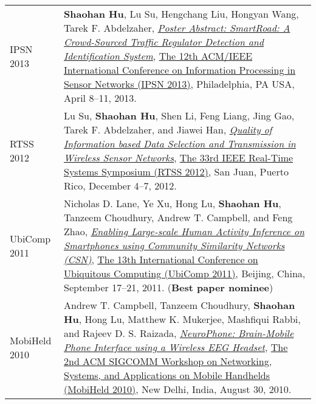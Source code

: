 \begin{longtabu}{p{.51\sectionwidth} p{.78\resumewidth}}
{\sc IPSN 2013}\hypertarget{hu2013ipsn}{} &
\textbf{Shaohan Hu}, Lu Su, Hengchang Liu, Hongyan Wang, Tarek F. Abdelzaher,
\href{http://portal.acm.org/citation.cfm?id=2461433}{\emph{Poster Abstract: SmartRoad: A Crowd-Sourced Traffic Regulator Detection and Identification System}},
\href{http://ipsn.acm.org/2013/}{\textsf{The 12th ACM/IEEE International Conference on Information Processing in Sensor Networks (IPSN 2013)}},
Philadelphia, PA USA, April 8--11, 2013. \\


{\sc RTSS 2012}\hypertarget{su2012rtss}{} &
Lu Su, \textbf{Shaohan Hu}, Shen Li, Feng Liang, Jing Gao, Tarek F. Abdelzaher, and Jiawei Han,
\href{http://ieeexplore.ieee.org/document/6424815}{\emph{Quality of Information based Data Selection and Transmission in Wireless Sensor Networks}},
\href{http://sites.ieee.org/rtss2012/}{\textsf{The 33rd IEEE Real-Time Systems Symposium (RTSS 2012)}},
San Juan, Puerto Rico, December 4--7, 2012. \\

{\sc UbiComp 2011}\hypertarget{lane2011ubicomp}{} &
Nicholas D. Lane, Ye Xu, Hong Lu, \textbf{Shaohan Hu}, Tanzeem Choudhury, Andrew T. Campbell, and Feng Zhao,
\href{http://portal.acm.org/citation.cfm?id=2030160}{\emph{Enabling Large-scale Human Activity Inference on Smartphones using Community Similarity Networks (CSN)}},
\href{http://www.ubicomp.org/ubicomp2011/}{\textsf{The 13th International Conference on Ubiquitous Computing (UbiComp 2011)}},
Beijing, China, September 17--21, 2011. (\textbf{Best paper nominee}) \\

{\sc MobiHeld 2010}\hypertarget{campbell2010mobiheld}{} &
Andrew T. Campbell, Tanzeem Choudhury, \textbf{Shaohan Hu}, Hong Lu, Matthew K. Mukerjee, Mashfiqui Rabbi, and Rajeev D. S. Raizada,
\href{http://portal.acm.org/citation.cfm?id=1851326}{\emph{NeuroPhone: Brain-Mobile Phone Interface using a Wireless EEG Headset}},
\href{http://conferences.sigcomm.org/sigcomm/2010/mhcfp.php}{\textsf{The 2nd ACM SIGCOMM Workshop on Networking, Systems, and Applications on Mobile Handhelds (MobiHeld 2010)}},
New Delhi, India, August 30, 2010. \\


\end{longtabu}
